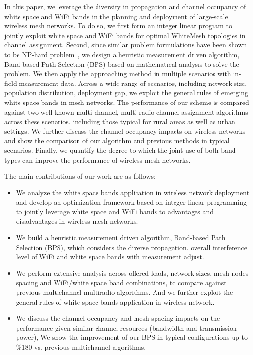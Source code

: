 In this paper, we leverage the diversity in propagation and channel occupancy of
white space and WiFi bands in the planning and deployment
of large-scale wireless mesh networks. To do so, we first form an
integer linear program to jointly exploit white space and WiFi 
bands for optimal WhiteMesh topologies in channel assignment. 
Second, since similar problem formulations have been shown to 
be NP-hard problem~\cite{jain2005impact,doraghinejad2014channel}, 
we design a heuristic measurement driven algorithm, Band-based 
Path Selection (BPS) based on mathematical analysis to solve the problem. 
We then apply the approaching method in multiple scenarios with in-field
measurement data. Across a wide range of scenarios, including 
network size, population distribution, deployment gap, we exploit 
the general rules of emerging white space bands in mesh networks. 
The performance of our scheme is compared against two well-known 
multi-channel, multi-radio channel assignment algorithms across 
these scenarios, including those typical for rural areas as well 
as urban settings. We further discuss the channel occupancy 
impacts on wireless networks and show the comparison of our
algorithm and previous methods in typical scenarios. 
Finally, we quantify the degree to which the joint use of 
both band types can improve the performance of wireless mesh networks.


The main contributions of our work are as follows:
\begin{itemize}
\item We analyze the white space bands application in wireless 
network deployment and develop an optimization framework based on integer
linear programming to jointly leverage white space and WiFi bands
to advantages and disadvantages in wireless mesh networks.  
\item We build a heuristic measurement driven algorithm, Band-based Path 
Selection (BPS), which considers the diverse propagation, overall interference 
level of WiFi and white space bands with measurement adjust.  
\item We perform extensive analysis across offered loads,
network sizes, mesh nodes spacing and WiFi/white space band combinations, to 
compare against previous multichannel multiradio algorithms. And we
further exploit the general rules of white space bands application in wireless network.  
\item We discuss the channel occupancy and mesh spacing impacts 
on the performance given similar channel resources (bandwidth and
transmission power), We show the improvement of our BPS in typical
configurations up to \%180 vs. previous multichannel algorithms.
\end{itemize}

